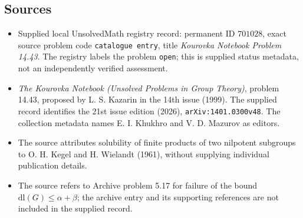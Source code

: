 \documentclass[11pt]{article}
\begin{document}
\subsection{Sources}
\begin{itemize}
\item Supplied local UnsolvedMath registry record: permanent ID \(701028\), exact source problem code \texttt{catalogue entry}, title \emph{Kourovka Notebook Problem 14.43}. The registry labels the problem \texttt{open}; this is supplied status metadata, not an independently verified assessment.
\item \emph{The Kourovka Notebook (Unsolved Problems in Group Theory)}, problem 14.43, proposed by L. S. Kazarin in the 14th issue (1999). The supplied record identifies the 21st issue edition (2026), \texttt{arXiv:1401.0300v48}. The collection metadata names E. I. Khukhro and V. D. Mazurov as editors.
\item The source attributes solubility of finite products of two nilpotent subgroups to O. H. Kegel and H. Wielandt (1961), without supplying individual publication details.
\item The source refers to Archive problem 5.17 for failure of the bound \(\mathrm{dl}(G)\le\alpha+\beta\); the archive entry and its supporting references are not included in the supplied record.
\end{itemize}
\end{document}
